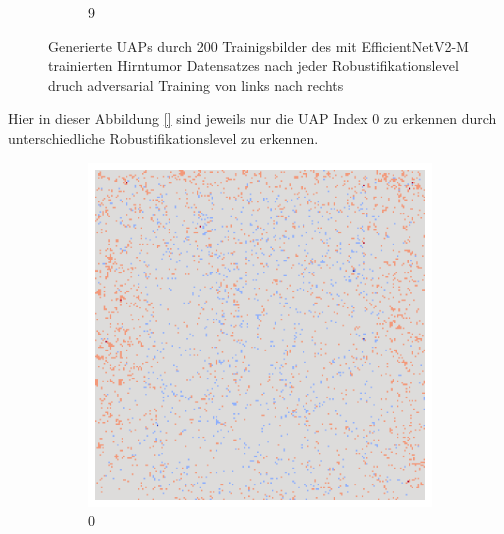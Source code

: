 \begin{figure}[ht!]
\begin{subfigure}{0.095\linewidth}
        \caption{9}
    \end{subfigure}
    \caption{Generierte UAPs durch 200 Trainigsbilder des mit EfficientNetV2-M trainierten Hirntumor Datensatzes nach jeder Robustifikationslevel druch adversarial Training von links nach rechts}
    \label{fig:uap-resnet18-covidx-rob0}
\end{figure}

Hier in dieser Abbildung \ref{} sind jeweils nur die UAP Index 0 zu erkennen durch unterschiedliche Robustifikationslevel zu erkennen. 


\begin{figure}[ht!]
    \centering
    \begin{subfigure}{0.095\linewidth}
        \centering
        \includegraphics[height=1\linewidth]{01-images/05-resultate/uap_resnet/uap0-resnet18-mri-n200-robustificationslevel0.png}
        \caption{0}
    \end{subfigure}\hfill%
    \begin{subfigure}{0.095\linewidth}
        \centering

\end{subfigure}
\end{figure}
